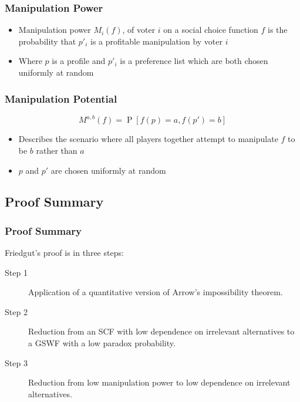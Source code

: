 \documentclass[aspectratio=169]{beamer}
\DeclareMathOperator{\probability}{P}
\begin{document}
		\begin{frame}
			\frametitle{Manipulation Power}

			\begin{itemize}
				\item Manipulation power $M_i(f)$, of voter $i$ on a social choice function $f$ is the probability that $p'_i$ is a profitable manipulation by voter $i$
				\item Where $p$ is a profile and $p'_i$ is a preference list which are both chosen uniformly at random
			\end{itemize}
		\end{frame}

		\begin{frame}
			\frametitle{Manipulation Potential}

			\[
				M^{a,b}(f) = \probability[f(p) = a, f(p') = b]
			\]

			\begin{itemize}
				\item Describes the scenario where all players together attempt to manipulate $f$ to be $b$ rather than $a$
				\item $p$ and $p'$ are chosen uniformly at random
			\end{itemize}

		\end{frame}


	\subsection{Proof Summary}

		\begin{frame}
			\frametitle{Proof Summary}

			Friedgut's proof is in three steps:

			\begin{description}
				\item[Step 1] Application of a quantitative version of Arrow's impossibility theorem.
				\item[Step 2] Reduction from an SCF with low dependence on irrelevant alternatives to a GSWF with a low paradox probability.
				\item[Step 3] Reduction from low manipulation power to low dependence on irrelevant alternatives.
			\end{description}
		\end{frame}
\end{document}
